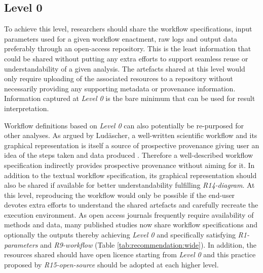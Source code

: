 \documentclass[a4paper,num-refs]{oup-contemporary}
\begin{document}
\subsection{Level 0} \label{sec:level0}
To achieve this level, researchers should share the workflow specifications, input parameters used for a given workflow enactment, raw logs and output data preferably through an open-access repository. This is the least information that could be shared without putting any extra efforts to support seamless reuse or understandability of a given analysis. The artefacts shared at this level would only require uploading of the associated resources to a repository without necessarily providing any supporting metadata or provenance information. Information captured at \textit{Level 0} is the bare minimum that can be used for result interpretation. 

Workflow definitions based on \textit{Level 0} can also potentially be re-purposed for other analyses. As argued by Ludäscher, a well-written scientific workflow and its graphical representation is itself a source of prospective provenance giving user an idea of the steps taken and data produced \citep{ludascher2016brief}. Therefore a well-described workflow specification indirectly provides prospective provenance without aiming for it. In addition to the textual workflow specification, its graphical representation should also be shared if available for better understandability fulfilling \textit{R14-diagram}. At this level, reproducing the workflow would only be possible if the end-user devotes extra efforts to understand the shared artefacts and carefully recreate the execution environment. As open access journals frequently require availability of methods and data, many published studies now share workflow specifications and optionally the outputs thereby achieving \textit{Level 0} and specifically satisfying \textit{R1-parameters} and \textit{R9-workflow} (Table \ref{tab:recommendation:wide}). In addition, the resources shared should have open licence starting from \textit{Level 0} and this practice proposed by \textit{R15-open-source} should be adopted at each higher level. 
\end{document}
